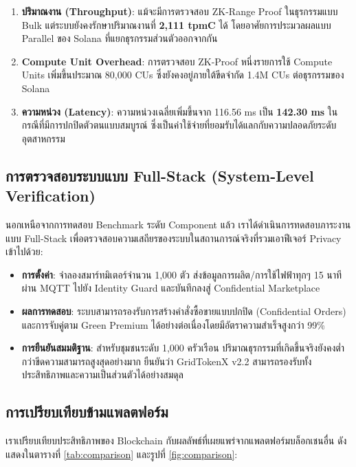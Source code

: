 \documentclass[conference,10pt]{IEEEtran}
\begin{document}
\begin{enumerate}
    \item \textbf{ปริมาณงาน (Throughput)}: แม้จะมีการตรวจสอบ ZK-Range Proof ในธุรกรรมแบบ Bulk แต่ระบบยังคงรักษาปริมาณงานที่ \textbf{2,111 tpmC} ได้ โดยอาศัยการประมวลผลแบบ Parallel ของ Solana ที่แยกธุรกรรมส่วนตัวออกจากกัน
    \item \textbf{Compute Unit Overhead}: การตรวจสอบ ZK-Proof หนึ่งรายการใช้ Compute Units เพิ่มขึ้นประมาณ 80,000 CUs ซึ่งยังคงอยู่ภายใต้ขีดจำกัด 1.4M CUs ต่อธุรกรรมของ Solana 
    \item \textbf{ความหน่วง (Latency)}: ความหน่วงเฉลี่ยเพิ่มขึ้นจาก 116.56 ms เป็น \textbf{142.30 ms} ในกรณีที่มีการปกปิดตัวตนแบบสมบูรณ์ ซึ่งเป็นค่าใช้จ่ายที่ยอมรับได้แลกกับความปลอดภัยระดับอุตสาหกรรม
\end{enumerate}

\subsection{การตรวจสอบระบบแบบ Full-Stack (System-Level Verification)}
นอกเหนือจากการทดสอบ Benchmark ระดับ Component แล้ว เราได้ดำเนินการทดสอบภาระงานแบบ Full-Stack เพื่อตรวจสอบความเสถียรของระบบในสถานการณ์จริงที่รวมเอาฟีเจอร์ Privacy เข้าไปด้วย:

\begin{itemize}
    \item \textbf{การตั้งค่า}: จำลองสมาร์ทมิเตอร์จำนวน 1,000 ตัว ส่งข้อมูลการผลิต/การใช้ไฟฟ้าทุกๆ 15 นาที ผ่าน MQTT ไปยัง Identity Guard และบันทึกลงสู่ Confidential Marketplace
    \item \textbf{ผลการทดสอบ}: ระบบสามารถรองรับการสร้างคำสั่งซื้อขายแบบปกปิด (Confidential Orders) และการจับคู่ตาม Green Premium ได้อย่างต่อเนื่องโดยมีอัตราความสำเร็จสูงกว่า 99\%
    \item \textbf{การยืนยันสมมติฐาน}: สำหรับชุมชนระดับ 1,000 ครัวเรือน ปริมาณธุรกรรมที่เกิดขึ้นจริงยังคงต่ำกว่าขีดความสามารถสูงสุดอย่างมาก ยืนยันว่า GridTokenX v2.2 สามารถรองรับทั้งประสิทธิภาพและความเป็นส่วนตัวได้อย่างสมดุล
\end{itemize}

\subsection{การเปรียบเทียบข้ามแพลตฟอร์ม}
เราเปรียบเทียบประสิทธิภาพของ Blockchain กับผลลัพธ์ที่เผยแพร่จากแพลตฟอร์มบล็อกเชนอื่น ดังแสดงในตารางที่ \ref{tab:comparison} และรูปที่ \ref{fig:comparison}:
\end{document}
